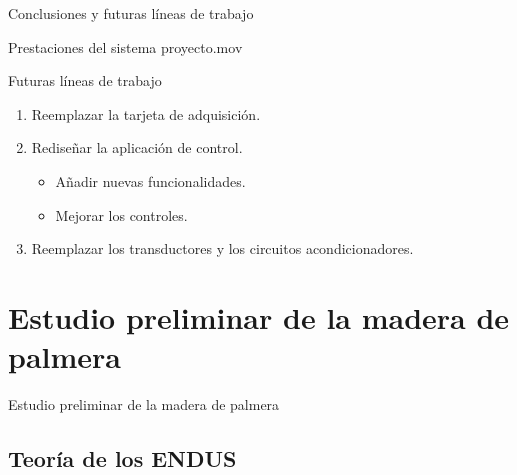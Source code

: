 \documentclass[utf8, compress]			{beamer}
\begin{document}
\begin{frame}{Conclusiones y futuras líneas de trabajo}
    \tableofcontents[currentsubsection]
\end{frame}

\begin{frame}{Prestaciones del sistema}
    \centering{}
    {proyecto.mov}
\end{frame}

\begin{frame}{Futuras líneas de trabajo}
    \begin{enumerate}
	\item Reemplazar la tarjeta de adquisición.
	\item Rediseñar la aplicación de control.
	    \begin{itemize}
		\item Añadir nuevas funcionalidades.
		\item Mejorar los controles.
	    \end{itemize}
	\item Reemplazar los transductores y los circuitos
	    acondicionadores.
    \end{enumerate}
\end{frame}


\section{Estudio preliminar de la madera de palmera}

\begin{frame}{Estudio preliminar de la madera de palmera}
    \tableofcontents[currentsection]
\end{frame}


\subsection{Teoría de los ENDUS}
\end{document}
